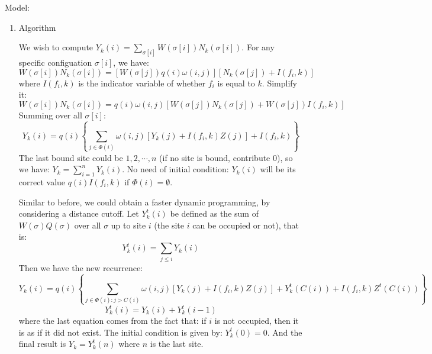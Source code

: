 \documentclass[11pt]{article}
\begin{document}
\begin{enumerate}
Model: 
\begin{enumerate}

\item Algorithm

We wish to compute $Y_k(i) = \sum_{\sigma[i]}W(\sigma[i])N_k(\sigma[i])$. For any specific configuation $\sigma[i]$, we have: 
\begin{equation}
W(\sigma[i]) N_k(\sigma[i]) = \left[ W(\sigma[j]) q(i) \omega(i, j) \right] \left[ N_k(\sigma[j]) + I(f_i, k) \right]
\end{equation}
where $I(f_i, k)$ is the indicator variable of whether $f_i$ is equal to $k$. Simplify it: 
\begin{equation}
W(\sigma[i]) N_k(\sigma[i]) = q(i) \omega(i, j) \left[ W(\sigma[j]) N_k(\sigma[j]) + W(\sigma[j]) I(f_i, k) \right]
\end{equation}
Summing over all $\sigma[i]$: 
\begin{equation}
Y_k(i) = q(i) \left\{ \sum_{j \in \Phi (i)} \omega(i, j) \left[ Y_k(j) + I(f_i, k) Z(j) \right]  + I(f_i, k) \right\}
\end{equation}
The last bound site could be $1,2,\cdots,n$ (if no site is bound, contribute 0), so we have: $Y_k = \sum_{i=1}^{n}Y_k(i)$. No need of initial condition: $Y_k(i)$ will be its correct value $q(i) I(f_i, k)$ if $\Phi (i) = \emptyset$. 

Similar to before, we could obtain a faster dynamic programming, by considering a distance cutoff. Let $Y_k^t(i)$ be defined as the sum of $W(\sigma)Q(\sigma)$ over all $\sigma$ up to site $i$ (the site $i$ can be occupied or not), that is: 
\begin{equation}
Y_k^t(i) = \sum_{j \leq i} Y_k(i)
\end{equation}
Then we have the new recurrence: 
\begin{equation}
Y_k(i) = q(i) \left\{ \sum_{j \in \Phi (i): j > C(i)} \omega(i, j) \left[ Y_k(j) + I(f_i, k) Z(j) \right] + Y_k^t(C(i)) + I(f_i, k) Z^t(C(i)) \right\}
\end{equation}
\begin{equation}
Y_k^t(i) = Y_k(i) + Y_k^t(i-1)
\end{equation}
where the last equation comes from the fact that: if $i$ is not occupied, then it is as if it did not exist. The initial condition is given by: $Y_k^t(0) = 0$. And the final result is $Y_k = Y_k^t(n)$ where $n$ is the last site. 



\end{enumerate}
\end{enumerate}
\end{document}
